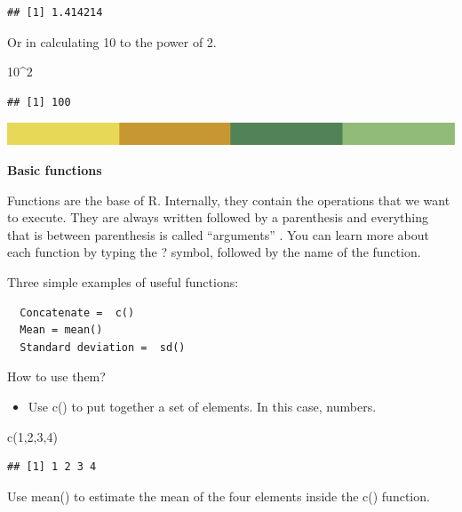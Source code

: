 \documentclass[
]{book}
\newenvironment{Shaded}{\begin{snugshade}}{\end{snugshade}}
\newcommand{\DecValTok}[1]{\textcolor[rgb]{0.00,0.00,0.81}{#1}}
\newcommand{\FunctionTok}[1]{\textcolor[rgb]{0.00,0.00,0.00}{#1}}
\newcommand{\NormalTok}[1]{#1}
\newcommand{\SpecialCharTok}[1]{\textcolor[rgb]{0.00,0.00,0.00}{#1}}
\providecommand{\tightlist}{%
  \setlength{\itemsep}{0pt}\setlength{\parskip}{0pt}}
\begin{document}
\begin{verbatim}
## [1] 1.414214
\end{verbatim}

Or in calculating 10 to the power of 2.

\begin{Shaded}
\begin{Highlighting}[]
\DecValTok{10}\SpecialCharTok{\^{}}\DecValTok{2}
\end{Highlighting}
\end{Shaded}

\begin{verbatim}
## [1] 100
\end{verbatim}

\includegraphics{rsrstrip.png}

\textbf{Basic functions}

Functions are the base of R. Internally, they contain the operations that we want to execute. They are always written followed by a parenthesis and everything that is between parenthesis is called ``arguments'' . You can learn more about each function by typing the ? symbol, followed by the name of the function.

Three simple examples of useful functions:

\begin{verbatim}
  Concatenate =  c() 
  Mean = mean()
  Standard deviation =  sd()
\end{verbatim}

How to use them?

\begin{itemize}
\tightlist
\item
  Use c() to put together a set of elements. In this case, numbers.
\end{itemize}

\begin{Shaded}
\begin{Highlighting}[]
\FunctionTok{c}\NormalTok{(}\DecValTok{1}\NormalTok{,}\DecValTok{2}\NormalTok{,}\DecValTok{3}\NormalTok{,}\DecValTok{4}\NormalTok{)}
\end{Highlighting}
\end{Shaded}

\begin{verbatim}
## [1] 1 2 3 4
\end{verbatim}

Use mean() to estimate the mean of the four elements inside the c() function.
\end{document}
